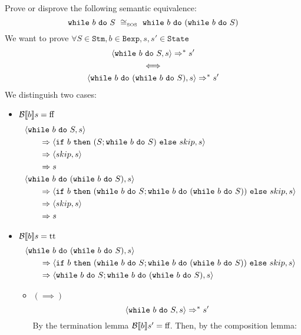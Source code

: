 \begin{exercise}{
    Prove or disprove the following semantic equivalence:
    \[ \wwhile{b}{S}\ \cong_{\text{\tiny SOS}}\ \wwhile{b}{(\wwhile{b}{S})}  \]
}
    We want to prove $\forall S \in \texttt{Stm}, b \in \texttt{Bexp}, s, s' \in \texttt{State}$
    \begin{gather*}
        \left<\texttt{while}\ b\ \texttt{do}\ S, s\right> \Rightarrow^* s' \\
        \iff \\
        \left<\texttt{while}\ b\ \texttt{do}\ (\texttt{while}\ b\ \texttt{do}\ S), s\right> \Rightarrow^* s'
    \end{gather*}
    We distinguish two cases:
    \begin{itemize}
        \item $\mathcal{B} \llbracket b \rrbracket s = \text{ff}$
            \begin{align*}
                &\left<\texttt{while}\ b\ \texttt{do}\ S, s\right>
                \\&\qquad\Rightarrow \left<\texttt{if}\ b\ \texttt{then}\ (S; \texttt{while}\ b\ \texttt{do}\ S)\ \texttt{else}\ skip, s\right>
                \\&\qquad\Rightarrow \left<skip, s\right>
                \\&\qquad\Rightarrow s
                \\
                &\left<\texttt{while}\ b\ \texttt{do}\ (\texttt{while}\ b\ \texttt{do}\ S), s\right>
                \\&\qquad\Rightarrow \left<\texttt{if}\ b\ \texttt{then}\ (\texttt{while}\ b\ \texttt{do}\ S; \texttt{while}\ b\ \texttt{do}\ (\texttt{while}\ b\ \texttt{do}\ S))\ \texttt{else}\ skip, s\right>
                \\&\qquad\Rightarrow \left<skip, s\right>
                \\&\qquad\Rightarrow s
            \end{align*}
        \item $\mathcal{B} \llbracket b \rrbracket s = \text{tt}$
            \begin{align*}
                &\left<\texttt{while}\ b\ \texttt{do}\ (\texttt{while}\ b\ \texttt{do}\ S), s\right>
                \\&\qquad\Rightarrow \left<\texttt{if}\ b\ \texttt{then}\ (\texttt{while}\ b\ \texttt{do}\ S; \texttt{while}\ b\ \texttt{do}\ (\texttt{while}\ b\ \texttt{do}\ S))\ \texttt{else}\ skip, s\right>
                \\&\qquad\Rightarrow \left<\texttt{while}\ b\ \texttt{do}\ S; \texttt{while}\ b\ \texttt{do}\ (\texttt{while}\ b\ \texttt{do}\ S), s\right>
            \end{align*}
            \begin{itemize}
                \item $(\implies)$
                    \[ \left<\texttt{while}\ b\ \texttt{do}\ S, s\right> \Rightarrow^* s' \]
                    By the termination lemma $\mathcal{B} \llbracket b \rrbracket s' = \text{ff}$. Then, by the composition lemma:
                    \begin{align*}

\end{align*}
\end{itemize}
\end{itemize}
\end{exercise}
